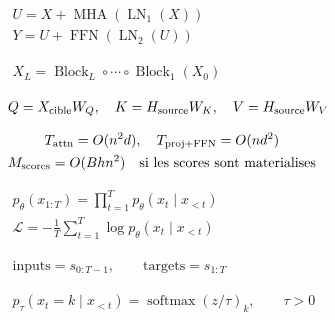 \documentclass[border=4pt,multi=preview]{standalone}
\begin{document}
\begin{preview}\color{ink}\fontsize{24}{30}\selectfont
$\displaystyle \begin{gathered}U=X+\operatorname{MHA}(\operatorname{LN}_1(X))\\Y=U+\operatorname{FFN}(\operatorname{LN}_2(U))\end{gathered}$
\end{preview}
\begin{preview}\color{ink}\fontsize{24}{30}\selectfont
$\displaystyle \begin{gathered}X_L=\operatorname{Block}_L\circ\cdots\circ\operatorname{Block}_1(X_0)\end{gathered}$
\end{preview}
\begin{preview}\color{ink}\fontsize{24}{30}\selectfont
$\displaystyle \begin{gathered}Q=X_{\rm cible}W_Q,\quad K=H_{\rm source}W_K,\quad V=H_{\rm source}W_V\end{gathered}$
\end{preview}
\begin{preview}\color{ink}\fontsize{24}{30}\selectfont
$\displaystyle \begin{gathered}T_{\rm attn}=O(n^2d),\quad T_{\rm proj+FFN}=O(nd^2)\\M_{\rm scores}=O(Bhn^2)\quad\text{si les scores sont materialises}\end{gathered}$
\end{preview}
\begin{preview}\color{ink}\fontsize{24}{30}\selectfont
$\displaystyle \begin{gathered}p_\theta(x_{1:T})=\prod_{t=1}^{T}p_\theta(x_t\mid x_{<t})\\\mathcal L=-\frac1T\sum_{t=1}^{T}\log p_\theta(x_t\mid x_{<t})\end{gathered}$
\end{preview}
\begin{preview}\color{ink}\fontsize{24}{30}\selectfont
$\displaystyle \begin{gathered}\text{inputs}=s_{0:T-1},\qquad\text{targets}=s_{1:T}\end{gathered}$
\end{preview}
\begin{preview}\color{ink}\fontsize{24}{30}\selectfont
$\displaystyle \begin{gathered}p_\tau(x_t=k\mid x_{<t})=\operatorname{softmax}(z/\tau)_k,\qquad\tau>0\end{gathered}$
\end{preview}
\end{document}
